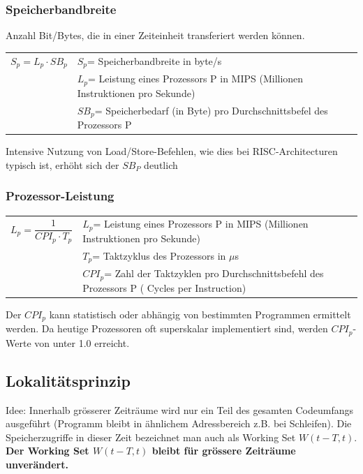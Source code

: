 \subsubsection{Speicherbandbreite}
Anzahl Bit/Bytes, die in einer Zeiteinheit transferiert werden können.\newline
\begin{tabular}{cl}
    $ S_p = L_p \cdot SB_p $&$ S_p $= Speicherbandbreite in byte/s\\
    & $ L_p $= Leistung eines Prozessors P in MIPS (Millionen Instruktionen pro Sekunde)\\
    &$ SB_p $= Speicherbedarf (in Byte) pro Durchschnittsbefel des Prozessors P\\   
\end{tabular}
Intensive Nutzung von Load/Store-Befehlen, wie dies bei RISC-Architecturen typisch ist, erhöht sich der $ SB_P $ deutlich

\subsubsection{Prozessor-Leistung}
\begin{tabular}{cl}
    $ L_p = \dfrac{1}{CPI_p \cdot T_p} $ & $ L_p $= Leistung eines Prozessors P in MIPS (Millionen Instruktionen pro Sekunde)\\
    &$ T_p $= Taktzyklus des Prozessors in $ \mu $s\\
    &$ CPI_p $= Zahl der Taktzyklen pro Durchschnittsbefehl des Prozessors P ( Cycles per Instruction)\\   
\end{tabular}
Der $ CPI_p $ kann statistisch oder abhängig von bestimmten Programmen ermittelt werden. Da heutige Prozessoren oft superskalar implementiert sind, werden $ CPI_p $-Werte von unter 1.0 erreicht.

\subsection{Lokalitätsprinzip}

Idee: Innerhalb grösserer Zeiträume wird nur ein Teil des gesamten Codeumfangs ausgeführt (Programm bleibt in ähnlichem Adressbereich z.B. bei Schleifen).
Die Speicherzugriffe in dieser Zeit bezeichnet man auch als Working Set $W(t-T,t)$.
\textbf{Der Working Set $W(t-T,t)$ bleibt für grössere Zeiträume unverändert.}


